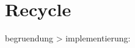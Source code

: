 \chapter{Recycle}


begruendung > implementierung:\\
\begin{comment}
Ausgangszustand: aktuelle Situation des Teilnehmenden\\
Zielzustand: Punkte 1, 2 und 3 der Kurszielsetzung 
Erfolg: Evaluation des Projektes anhand des Erfüllungsgrades der Kursziele\\
Punkt 3 der Kursziele lässt sich als Schnittstelle des Teilnehmers zu potentiellen Arbeitgebern
definieren an welche der Kursteilnehmer die Parameter seiner Fähigkeiten an den Arbeitgeber übergibt, 
diese auf Kompatibilität geprüft werden und bei hinreichender Übereinstimmung eine Zusammenarbeit zustande kommt.\\
\end{comment}

